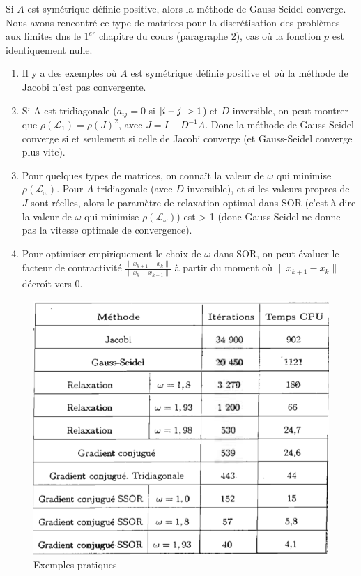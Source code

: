\begin{coroll}
    Si $A$ est symétrique définie positive, alors la méthode de Gauss-Seidel converge.
    Nous avons rencontré ce type de matrices pour la discrétisation des problèmes aux limites dns le $1^{er}$ chapitre du cours (paragraphe 2), cas où la fonction $p$ est identiquement nulle.
\end{coroll}

\begin{remark}
    \begin{enumerate}
        \item Il y a des exemples où $A$ est symétrique définie positive et où la méthode de Jacobi n'est pas convergente.
        \item Si A est tridiagonale ($a_{ij}=0$ si $\left\lvert i-j\right\rvert>1$) et $D$ inversible, on peut montrer que $\rho(\mathcal{L}_1)=\rho(J)^2$, avec $J = I - D^{-1} A$. Donc la méthode de Gauss-Seidel converge si et seulement si celle de Jacobi converge (et Gauss-Seidel converge plus vite).
        \item  Pour quelques types de matrices, on connaît la valeur de $\omega$ qui minimise $\rho (\mathcal{L}_{\omega})$.
            Pour $A$ tridiagonale (avec $D$ inversible), et si les valeurs propres de $J$ sont réelles, alors le paramètre de relaxation optimal dans SOR (c'est-à-dire la valeur de $\omega$ qui minimise $\rho (\mathcal{L}_{\omega})$) est > 1 (donc Gauss-Seidel ne donne pas la vitesse optimale de convergence).
        \item Pour optimiser empiriquement le choix de $\omega$ dans SOR, on peut évaluer le facteur de contractivité $\frac{\| x_{k+1} - x_k\|}{\| x_k - x_{k-1}\|}$ à partir du moment où $\|x_{k+1}-x_{k}\|$ décroît vers 0.
    \end{enumerate}
\end{remark}

\begin{figure}[h]
    \centering
    \includegraphics[scale=0.5]{tableau.png}
    \caption{Exemples pratiques}
    \label{fig:tableau}
\end{figure}

